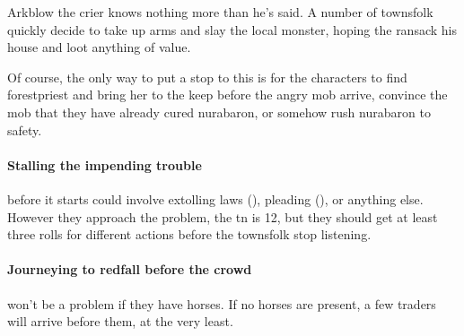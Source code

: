 Arkblow the crier knows nothing more than he's said.  A number of townsfolk quickly decide to take up arms and slay the local monster, hoping the ransack his house and loot anything of value.

Of course, the only way to put a stop to this is for the characters to find \gls{forestpriest} and bring her to the keep before the angry mob arrive, convince the mob that they have already cured \gls{nurabaron}, or somehow rush \gls{nurabaron} to safety.

\paragraph{Stalling the impending trouble}
before it starts could involve extolling laws (), pleading (), or anything else.
However they approach the problem, the \gls{tn} is 12, but they should get at least three rolls for different actions before the townsfolk stop listening.

\paragraph{Journeying to \gls{redfall} before the crowd}
won't be a problem if they have horses.
If no horses are present, a few traders will arrive before them, at the very least.

